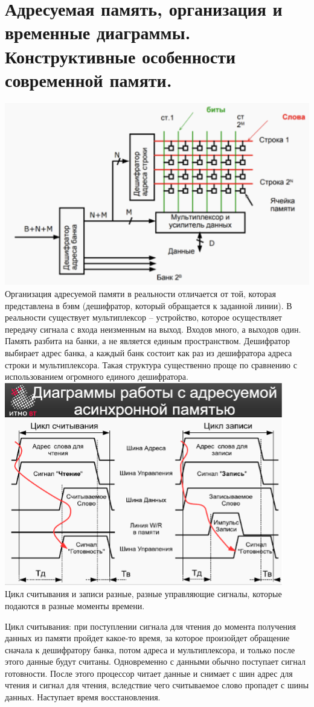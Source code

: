 \documentclass{article}
\begin{document}
\section{Адресуемая память, организация и временные диаграммы. Конструктивные особенности современной памяти.}
\includegraphics[width=.8\textwidth]{memory_adr.png}\\
Организация адресуемой памяти в реальности отличается от той, которая представлена в бэвм (дешифратор, который обращается к заданной линии). 
В реальности существует мультиплексор – устройство, которое осуществляет передачу сигнала с входа неизменным на выход. 
Входов много, а выходов один. Память разбита на банки, а не является единым пространством. 
Дешифратор выбирает адрес банка, а каждый банк состоит как раз из дешифратора адреса строки и мультиплексора. 
Такая структура существенно проще по сравнению с использованием огромного единого дешифратора.
\\
\includegraphics[width=.8\textwidth]{addr_mem.png}\\
Цикл считывания и записи разные, разные управляющие сигналы, которые подаются в разные моменты времени. 

Цикл считывания: при поступлении сигнала для чтения до момента получения данных из памяти пройдет какое-то время, 
за которое произойдет обращение сначала к дешифратору банка, потом адреса и мультиплексора, и только после этого данные будут считаны. 
Одновременно с данными обычно поступает сигнал готовности. 
После этого процессор читает данные и снимает с шин адрес для чтения и сигнал для чтения, 
вследствие чего считываемое слово пропадет с шины данных. Наступает время восстановления.
\end{document}
